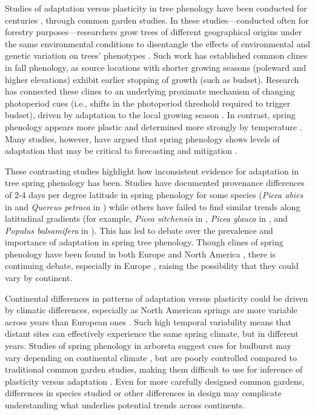 \documentclass{article}
\begin{document}
Studies of adaptation versus plasticity in tree phenology have been conducted for centuries \citep{Cleland:2007or}, through common garden studies. In these studies---conducted often for forestry purposes---researchers grow trees of different geographical origins under the same environmental conditions to disentangle the effects of environmental and genetic variation on trees’ phenotypes \citep{AitkenBemmels16, Alberto13}. Such work has established common clines in fall phenology, as source locations with shorter growing seasons (poleward and higher elevations) exhibit earlier stopping of growth (such as budset). Research has connected these clines to an underlying proximate mechanism of changing photoperiod cues (i.e., shifts in the photoperiod threshold required to trigger budset), driven by adaptation to the local growing season \citep{Alberto13,Savolainen07}. In contrast, spring phenology appears more plastic \citep{AitkenBemmels16} and determined more strongly by temperature \citep{flynn18}. Many studies, however, have argued that spring phenology shows levels of adaptation that may be critical to forecasting and mitigation \citep{vitasse2009,Basler:2012}. 

These contrasting studies highlight how inconsistent evidence for adaptation in tree spring phenology has been. Studies have documented provenance differences of 2-4 days per degree latitude in spring phenology for some species (\emph{Picea abies} in \citealp{sog08} and \emph{Quercus petraea} in \citealp{deans96}) while others have failed to find similar trends along latitudinal gradients (for example, \emph{Picea sitchensis} in \citealp{mimura07}, \emph{Picea glauca} in \citealp{Li97}, and \emph{Populus balsamifera} in \citealp{farmer93}). This has led to debate over the prevalence and importance of adaptation in spring tree phenology. Though clines of spring phenology have been found in both Europe \citep{sog08,deans96,von95} and North America \citep{rossi15, soo13, hannerz99}, there is continuing debate, especially in Europe \citep{deans96,vitasse2009,Basler:2012}, raising the possibility that they could vary by continent. 

Continental differences in patterns of adaptation versus plasticity could be driven by climatic differences, especially as North American springs are more variable across years than European ones \citep{tward21,zohner2017,schwartz00}. Such high temporal variability means that distant sites can effectively experience the same spring climate, but in different years. Studies of spring phenology in arboreta suggest cues for budburst may vary depending on continental climate \citep{zohner2017}, but are poorly controlled compared to traditional common garden studies, making them difficult to use for inference of plasticity versus adaptation \citep{gauzere2020}. Even for more carefully designed common gardens, differences in species studied or other differences in design may complicate understanding what underlies potential trends across continents.  %
\end{document}
